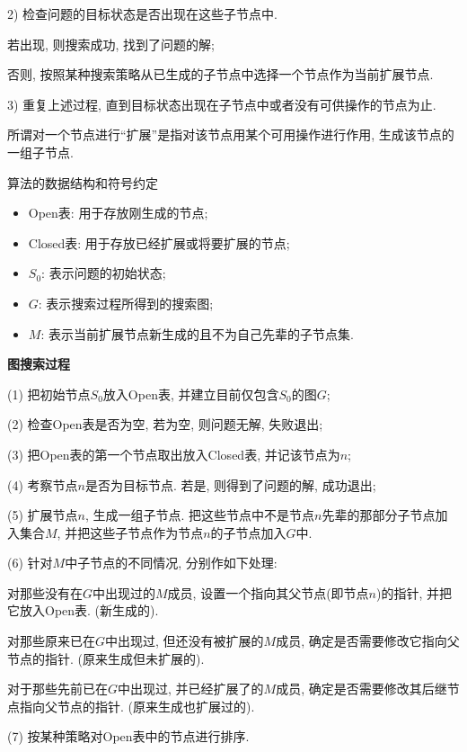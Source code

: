 2) 检查问题的目标状态是否出现在这些子节点中.

\qquad{} 若出现, 则搜索成功, 找到了问题的解;

\qquad{} 否则, 按照某种搜索策略从已生成的子节点中选择一个节点作为当前扩展节点.

3) 重复上述过程, 直到目标状态出现在子节点中或者没有可供操作的节点为止.

\begin{remark}
    所谓对一个节点进行“扩展”是指对该节点用某个可用操作进行作用, 生成该节点的一组子节点.
\end{remark}

算法的数据结构和符号约定
\begin{itemize}
\item Open表: 用于存放刚生成的节点;
\item Closed表: 用于存放已经扩展或将要扩展的节点;
\item $S_0$: 表示问题的初始状态;
\item $G$: 表示搜索过程所得到的搜索图;
\item $M$: 表示当前扩展节点新生成的且不为自己先辈的子节点集.
\end{itemize}

\textbf{图搜索过程}

\quad (1) 把初始节点$S_0$放入Open表, 并建立目前仅包含$S_0$的图$G$;

\quad (2) 检查Open表是否为空, 若为空, 则问题无解, 失败退出;

\quad (3) 把Open表的第一个节点取出放入Closed表, 并记该节点为$n$;

\quad (4) 考察节点$n$是否为目标节点. 若是, 则得到了问题的解, 成功退出;

\quad (5) 扩展节点$n$, 生成一组子节点. 把这些节点中不是节点$n$先辈的那部分子节点加入集合$M$, 并把这些子节点作为节点$n$的子节点加入$G$中.

\quad (6) 针对$M$中子节点的不同情况, 分别作如下处理:

    \quad \quad {} 对那些没有在$G$中出现过的$M$成员, 设置一个指向其父节点(即节点$n$)的指针, 并把它放入Open表. (新生成的).

    \quad \quad {} 对那些原来已在$G$中出现过, 但还没有被扩展的$M$成员, 确定是否需要修改它指向父节点的指针. (原来生成但未扩展的).

    \quad \quad {} 对于那些先前已在$G$中出现过, 并已经扩展了的$M$成员, 确定是否需要修改其后继节点指向父节点的指针. (原来生成也扩展过的).

\quad (7) 按某种策略对Open表中的节点进行排序.

